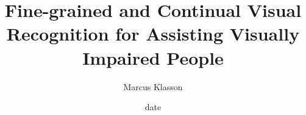 \documentclass[electronic, oldfontcommands]{kthesis}
\begin{document}
	
\newcommand*{\BuildingFromMainFile}{}
	
\title{Fine-grained and Continual Visual Recognition for Assisting Visually Impaired People}
\author{Marcus Klasson}
\date{date}
\address{KTH Royal Institute of Technology \\School of Electrical Engineering and Computer Science\\ Division of Robotics, Perception, and Learning \\ SE-10044 Stockholm, Sweden}
	
\maketitle

\frontmatter %


\newpage










	
\mainmatter %
\begingroup
\hypersetup{hidelinks} %
\tableofcontents
\endgroup
\end{document}
